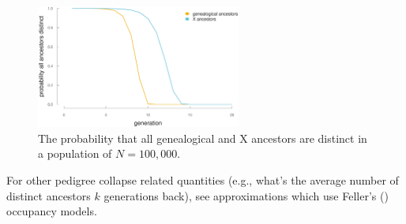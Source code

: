 \documentclass[11pt]{article}
\begin{document}
\begin{figure}[!ht]
  \centering
  \includegraphics[width=0.6\textwidth]{images/ped-collapse}
  \caption{The probability that all genealogical and X ancestors are distinct in a population of $N=100,000$.}
  \label{fig:ped-collapse}
\end{figure}

For other pedigree collapse related quantities (e.g., what's the average number
of distinct ancestors $k$ generations back), see
\textcite{wachter2013statistical} approximations which use Feller's
(\citeyear{feller1950introduction}) occupancy models.
\end{document}
